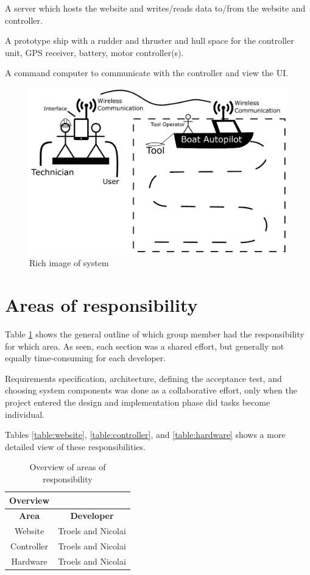 A server which hosts the website and writes/reads data to/from the website and controller.

A prototype ship with a rudder and thruster and hull space for the controller unit, GPS receiver, battery, motor controller(s).

A command computer to communicate with the controller and view the UI.

\begin{figure}[H]
	\centering
	\includegraphics[width=1\linewidth]{rich_image}
	\caption{Rich image of system}
	\label{table:rich_image}
\end{figure}

\section{Areas of responsibility}
Table \ref{table:overview} shows the general outline of which group member had the responsibility for which area. As seen, each section was a shared effort, but generally not equally time-consuming for each developer.

Requirements specification, architecture, defining the acceptance test, and choosing system components was done as a collaborative effort, only when the project entered the design and implementation phase did tasks become individual. 

Tables \ref{table:website}, \ref{table:controller}, and \ref{table:hardware} shows a more detailed view of these responsibilities.

\begin{table}[H]
\centering
\begin{tabular}{|c|c|}
\hline 
\textbf{Overview} & \\ 
\hline 
\textbf{Area} & \textbf{Developer} \\ 
\hline 
Website & Troels and Nicolai \\ 
\hline 
Controller & Troels and Nicolai \\ 
\hline 
Hardware & Troels and Nicolai \\ 
\hline 
\end{tabular} 
\caption{Overview of areas of responsibility}
\label{table:overview}
\end{table}

